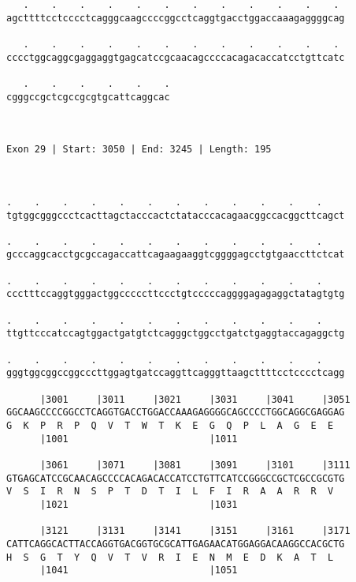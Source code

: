 \documentclass{article}
\begin{document}
\begin{Verbatim}
   .    .    .    .    .    .    .    .    .    .    .    . 
agcttttcctcccctcagggcaagccccggcctcaggtgacctggaccaaagaggggcag
                                                            
   .    .    .    .    .    .    .    .    .    .    .    . 
cccctggcaggcgaggaggtgagcatccgcaacagccccacagacaccatcctgttcatc
                                                            
   .    .    .    .    .    .
cgggccgctcgccgcgtgcattcaggcac
                             
                             
 
Exon 29 | Start: 3050 | End: 3245 | Length: 195



.    .    .    .    .    .    .    .    .    .    .    .    
tgtggcgggccctcacttagctacccactctatacccacagaacggccacggcttcagct
                                                            
.    .    .    .    .    .    .    .    .    .    .    .    
gcccaggcacctgcgccagaccattcagaagaaggtcggggagcctgtgaaccttctcat
                                                            
.    .    .    .    .    .    .    .    .    .    .    .    
ccctttccaggtgggactggcccccttccctgtcccccaggggagagaggctatagtgtg
                                                            
.    .    .    .    .    .    .    .    .    .    .    .    
ttgttcccatccagtggactgatgtctcagggctggcctgatctgaggtaccagaggctg
                                                            
.    .    .    .    .    .    .    .    .    .    .    .    
gggtggcggccggcccttggagtgatccaggttcagggttaagcttttcctcccctcagg
                                                            
      |3001     |3011     |3021     |3031     |3041     |3051
GGCAAGCCCCGGCCTCAGGTGACCTGGACCAAAGAGGGGCAGCCCCTGGCAGGCGAGGAG
G  K  P  R  P  Q  V  T  W  T  K  E  G  Q  P  L  A  G  E  E  
      |1001                         |1011                   
  
      |3061     |3071     |3081     |3091     |3101     |3111
GTGAGCATCCGCAACAGCCCCACAGACACCATCCTGTTCATCCGGGCCGCTCGCCGCGTG
V  S  I  R  N  S  P  T  D  T  I  L  F  I  R  A  A  R  R  V  
      |1021                         |1031                   
  
      |3121     |3131     |3141     |3151     |3161     |3171
CATTCAGGCACTTACCAGGTGACGGTGCGCATTGAGAACATGGAGGACAAGGCCACGCTG
H  S  G  T  Y  Q  V  T  V  R  I  E  N  M  E  D  K  A  T  L  
      |1041                         |1051                   
  

\end{Verbatim}
\end{document}
